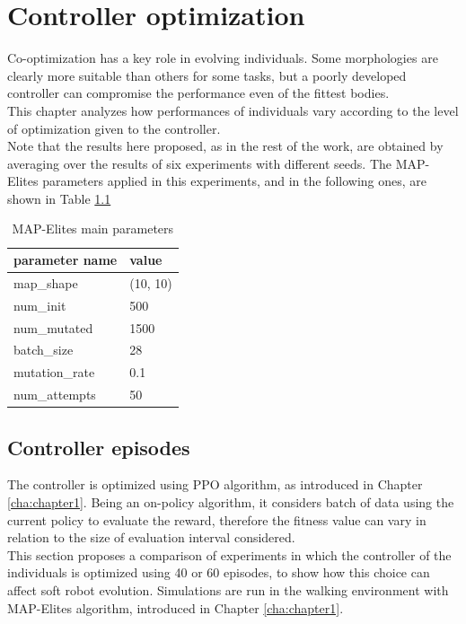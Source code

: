 \chapter{Controller optimization}
\label{cha:controller_optimization}

Co-optimization has a key role in evolving individuals.
Some morphologies are clearly more suitable than others for some tasks, but a poorly developed controller can compromise the performance even of the fittest bodies.\\
This chapter analyzes how performances of individuals vary according to the level of optimization given to the controller.\\
Note that the results here proposed, as in the rest of the work, are obtained by averaging over the results of six experiments with different seeds. The MAP-Elites parameters applied in this experiments, and in the following ones, are shown in Table \ref{tab:me_parameters}

\begin{table}[h]
    \centering
    \begin{tabular}{|ll|}
        \hline
        \textbf{parameter name} & \textbf{value}\\
        \hline
        map\_shape &  (10, 10)\\
        num\_init & 500\\
        num\_mutated &  1500\\
        batch\_size & 28\\
        mutation\_rate & 0.1\\
        num\_attempts & 50\\
    \hline
    \end{tabular}
    \caption{MAP-Elites main parameters}
    \label{tab:me_parameters}
\end{table}

\section{Controller episodes}
The controller is optimized using PPO algorithm, as introduced in Chapter \ref{cha:chapter1}. Being an on-policy algorithm, it considers batch of data using the current policy to evaluate the reward, therefore the fitness value can vary in relation to the size of evaluation interval considered.\\
This section proposes a comparison of experiments in which the controller of the individuals is optimized using 40 or 60 episodes, to show how this choice can affect soft robot evolution.
Simulations are run in the walking environment with MAP-Elites algorithm, introduced in Chapter \ref{cha:chapter1}.

